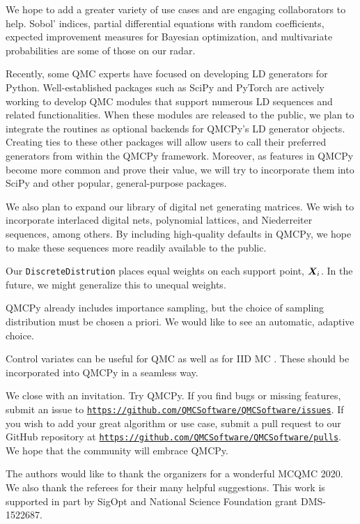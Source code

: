 \documentclass[graybox,footinfo]{svmult}
\begin{document}
We hope to add a greater variety of use cases and are engaging collaborators to help.  Sobol' indices, partial differential equations with random coefficients, expected improvement measures for Bayesian optimization, and multivariate probabilities are some of those on our radar.

Recently, some QMC experts have focused on developing LD generators for Python. 
Well-established packages such as SciPy \cite{SCIPY} and PyTorch \cite{PyTorch} are actively working to develop QMC modules that support numerous LD sequences and related functionalities. When these modules are released to the public, we plan to integrate the routines as optional backends for QMCPy's LD generator objects. Creating ties to these other packages will allow users to call their preferred generators from within the QMCPy framework.  Moreover, as features in QMCPy become more common and prove their value, we will try to incorporate them into SciPy and other popular, general-purpose packages.

We also plan to expand our library of digital net generating matrices. We wish to incorporate interlaced digital nets, polynomial lattices, and Niederreiter sequences, among others. By including high-quality defaults in QMCPy, we hope to make these sequences more readily available to the public. 

Our \texttt{DiscreteDistrution} places equal weights on each support point, ${\boldsymbol{X}}_i$.  In the future, we might generalize this to unequal weights.

QMCPy already includes importance sampling, but the choice of sampling distribution must be chosen a priori.  We would like to see an automatic, adaptive choice.

Control variates can be useful for QMC as well as for IID MC \cite{HicEtal03}.  These should be incorporated into QMCPy in a seamless way.

We close with an invitation.  Try QMCPy.  If you find bugs or missing features, submit an issue to \href{https://github.com/QMCSoftware/QMCSoftware/issues}{\nolinkurl{https://github.com/QMCSoftware/QMCSoftware/issues}}.  If you wish to add your great algorithm or use case, submit a pull request to our GitHub repository at \href{https://github.com/QMCSoftware/QMCSoftware/pulls}{\nolinkurl{https://github.com/QMCSoftware/QMCSoftware/pulls}}.  We hope that the community will embrace QMCPy.

\begin{acknowledgement}
The authors would like to thank the organizers for a wonderful MCQMC 2020. 
We also thank the referees for their many helpful suggestions.  This work is supported in part by SigOpt and National Science Foundation grant DMS-1522687.
\end{acknowledgement}
\end{document}
